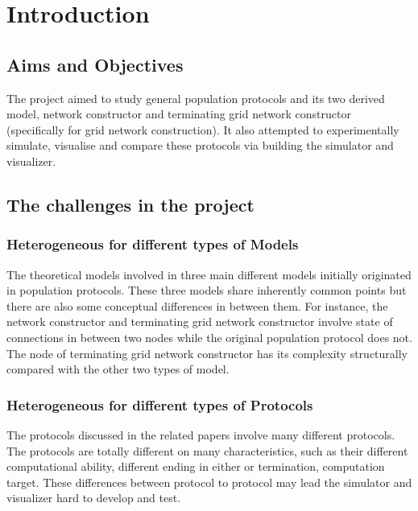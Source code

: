 \section{Introduction}
\subsection{Aims and Objectives}

\par\noindent
The project aimed to study general population protocols \cite{AspnesR2007} and
its two derived model,
network constructor \cite{MS16a} and terminating grid network constructor \cite{Mi17}
(specifically for grid network construction).
It also attempted to experimentally simulate, visualise and compare these protocols
via building the simulator and visualizer.

\subsection{The challenges in the project}
\subsubsection{Heterogeneous for different types of Models}

\par\noindent
The theoretical models involved in three main different models initially originated in
population protocols. These three models share inherently common points but there are also some
conceptual differences in between them. For instance, the network constructor \cite{MS16a} and terminating
grid network constructor \cite{Mi17}
involve state of connections in between two nodes while the original population protocol does not.
The node of terminating grid network constructor has its complexity structurally compared with
the other two types of model.

\subsubsection{Heterogeneous for different types of Protocols}

\par\noindent
The protocols discussed in the related papers \cite{AspnesR2007, MS16a, Mi17} involve
many different protocols. The protocols are totally different on many characteristics,
such as their different computational ability, different ending in either or termination,
computation target. These differences between
protocol to protocol may lead the simulator and visualizer hard to develop and test.

